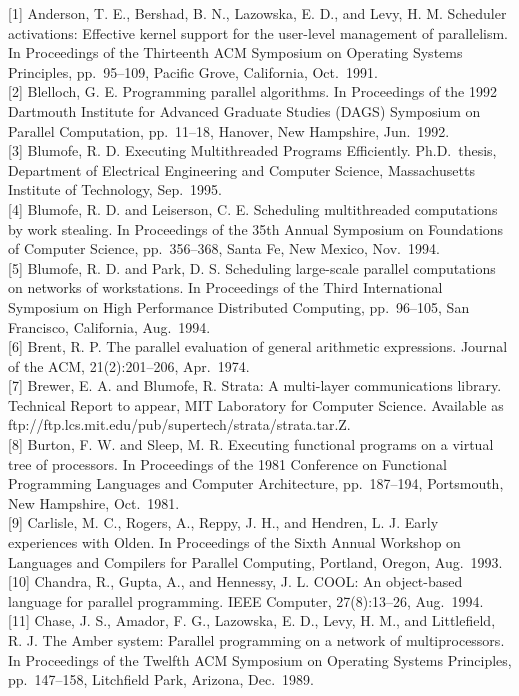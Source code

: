 \documentclass[
]{article}
\begin{document}
{[}1{]} Anderson, T. E., Bershad, B. N., Lazowska, E. D., and Levy, H.
M. Scheduler activations: Effective kernel support for the user-level
management of parallelism. In Proceedings of the Thirteenth ACM
Symposium on Operating Systems Principles, pp.~95--109, Pacific Grove,
California, Oct.~1991.\\
{[}2{]} Blelloch, G. E. Programming parallel algorithms. In Proceedings
of the 1992 Dartmouth Institute for Advanced Graduate Studies (DAGS)
Symposium on Parallel Computation, pp.~11--18, Hanover, New Hampshire,
Jun.~1992.\\
{[}3{]} Blumofe, R. D. Executing Multithreaded Programs Efficiently.
Ph.D.~thesis, Department of Electrical Engineering and Computer Science,
Massachusetts Institute of Technology, Sep.~1995.\\
{[}4{]} Blumofe, R. D. and Leiserson, C. E. Scheduling multithreaded
computations by work stealing. In Proceedings of the 35th Annual
Symposium on Foundations of Computer Science, pp.~356--368, Santa Fe,
New Mexico, Nov.~1994.\\
{[}5{]} Blumofe, R. D. and Park, D. S. Scheduling large-scale parallel
computations on networks of workstations. In Proceedings of the Third
International Symposium on High Performance Distributed Computing,
pp.~96--105, San Francisco, California, Aug.~1994.\\
{[}6{]} Brent, R. P. The parallel evaluation of general arithmetic
expressions. Journal of the ACM, 21(2):201--206, Apr.~1974.\\
{[}7{]} Brewer, E. A. and Blumofe, R. Strata: A multi-layer
communications library. Technical Report to appear, MIT Laboratory for
Computer Science. Available as
ftp://ftp.lcs.mit.edu/pub/supertech/strata/strata.tar.Z.\\
{[}8{]} Burton, F. W. and Sleep, M. R. Executing functional programs on
a virtual tree of processors. In Proceedings of the 1981 Conference on
Functional Programming Languages and Computer Architecture,
pp.~187--194, Portsmouth, New Hampshire, Oct.~1981.\\
{[}9{]} Carlisle, M. C., Rogers, A., Reppy, J. H., and Hendren, L. J.
Early experiences with Olden. In Proceedings of the Sixth Annual
Workshop on Languages and Compilers for Parallel Computing, Portland,
Oregon, Aug.~1993.\\
{[}10{]} Chandra, R., Gupta, A., and Hennessy, J. L. COOL: An
object-based language for parallel programming. IEEE Computer,
27(8):13--26, Aug.~1994.\\
{[}11{]} Chase, J. S., Amador, F. G., Lazowska, E. D., Levy, H. M., and
Littlefield, R. J. The Amber system: Parallel programming on a network
of multiprocessors. In Proceedings of the Twelfth ACM Symposium on
Operating Systems Principles, pp.~147--158, Litchfield Park, Arizona,
Dec.~1989.
\end{document}
